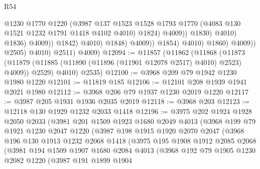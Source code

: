 \begin{lexlean}{R54}
\begin{coremodule}
                                              @1230
                                              @1770
                                              @1220
                                              (@3987
                                                @137
                                                @1523
                                                @1528
                                                @1793
                                                @1770
                                                (@4083 @130 @1521 @1232 @1791 @1418 @4102 @4010)
                                                @1824)
                                              @4009))
                                          @1830)
                                        @4010)
                                      @1836)
                                    @4009))
                                @1842)
                              @4010)
                            @1848)
                          @4009))
                      @1854)
                    @4010)
                  @1860)
                @4009))
            @2505)
          @4010)
        @2511)
      @4009)
@12094 := @11857
    (@11862
      (@11868
        (@11873 (@11879 (@11885 (@11890 (@11896 (@11901 @12078 @2517) @4010) @2523) @4009)) @2529)
        @4010)
      @2535)
@12100 := @3968 @209 @79 @1942 @1230 @1980 @1220
@12101 := @11819 @185
@12106 := @12101 @208 @1939 @1941 @2021 @1980
@12112 := @3968 @206 @79 @1937 @1230 @2019 @1220
@12117 := @3987 @205 @1931 @1936 @2035 @2019
@12118 := @3968 @203
@12123 := @12118 @130 @1929 @1232 @2033 @1418
@12196 := @3975
    @202
    @1924
    @1928
    @2050
    @2033
    (@3981
      @201
      @1509
      @1923
      @1680
      @2049
      @4013
      (@3968
        @199
        @79
        @1921
        @1230
        @2047
        @1220
        (@3987
          @198
          @1915
          @1920
          @2070
          @2047
          (@3968
            @196
            @130
            @1913
            @1232
            @2068
            @1418
            (@3975
              @195
              @1908
              @1912
              @2085
              @2068
              (@3981
                @194
                @1509
                @1907
                @1680
                @2084
                @4013
                (@3968
                  @192
                  @79
                  @1905
                  @1230
                  @2082
                  @1220
                  (@3987
                    @191
                    @1899
                    @1904

\end{coremodule}
\end{lexlean}
